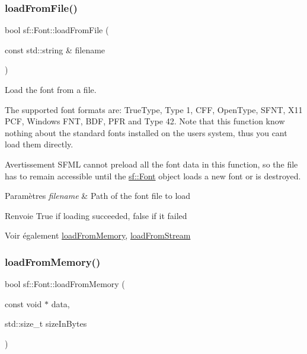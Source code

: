 \subsubsection{\texorpdfstring{load\+From\+File()}{loadFromFile()}}
{\footnotesize\ttfamily bool sf\+::\+Font\+::load\+From\+File (\begin{DoxyParamCaption}\item[{const std\+::string \&}]{filename }\end{DoxyParamCaption})}



Load the font from a file. 

The supported font formats are\+: True\+Type, Type 1, C\+FF, Open\+Type, S\+F\+NT, X11 P\+CF, Windows F\+NT, B\+DF, P\+FR and Type 42. Note that this function know nothing about the standard fonts installed on the user\textquotesingle{}s system, thus you can\textquotesingle{}t load them directly.

\begin{DoxyWarning}{Avertissement}
S\+F\+ML cannot preload all the font data in this function, so the file has to remain accessible until the \hyperlink{classsf_1_1Font}{sf\+::\+Font} object loads a new font or is destroyed.
\end{DoxyWarning}

\begin{DoxyParams}{Paramètres}
{\em filename} & Path of the font file to load\\
\hline
\end{DoxyParams}
\begin{DoxyReturn}{Renvoie}
True if loading succeeded, false if it failed
\end{DoxyReturn}
\begin{DoxySeeAlso}{Voir également}
\hyperlink{classsf_1_1Font_abf2f8d6de31eb4e1db02e061c323e346}{load\+From\+Memory}, \hyperlink{classsf_1_1Font_abc3f37a354ce8b9a21f8eb93bd9fdafb}{load\+From\+Stream} 
\end{DoxySeeAlso}
\mbox{\label{classsf_1_1Font_abf2f8d6de31eb4e1db02e061c323e346}} 
\subsubsection{\texorpdfstring{load\+From\+Memory()}{loadFromMemory()}}
{\footnotesize\ttfamily bool sf\+::\+Font\+::load\+From\+Memory (\begin{DoxyParamCaption}\item[{const void $\ast$}]{data,  }\item[{std\+::size\+\_\+t}]{size\+In\+Bytes }\end{DoxyParamCaption})}



